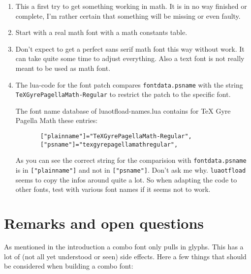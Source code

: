\documentclass[parskip=half-,egregdoesnotlikesansseriftitles]{scrartcl}
\begin{document}
\begin{enumerate}
\item  This a first try to get something working in math. It is in no way finished or complete, I'm rather certain that something  will be missing or even faulty.
\item  Start with a real math font with a math constants table. 
\item  Don't expect to get a perfect sans serif math font this way without work. It can take quite some time to adjust everything. Also a text font is not really meant to be used as math font.   
\item  The lua-code for the font patch compares \texttt{fontdata.psname} with the string \\\texttt{TeXGyrePagellaMath-Regular} to restrict the patch to the specific font.

       The font name database of luaotfload-names.lua contains for \textsf{TeX Gyre Pagella Math} these entries:
       
       \begin{verbatim}
       ["plainname"]="TeXGyrePagellaMath-Regular",
       ["psname"]="texgyrepagellamathregular",
       \end{verbatim}
       
  As you can see the correct string for the comparision with  \texttt{fontdata.psname}  is in \verb+["plainname"]+ and not in \verb+["psname"]+. Don't ask me why. \texttt{luaotfload} seems to copy the infos around quite a lot. So when adapting the code to other fonts, test with various font names if it seems not to work.
\end{enumerate}


\section{Remarks and open questions}

As mentioned in the introduction a combo font only pulls in glyphs. This has a lot of (not all yet understood or seen) side effects. Here a few things that should be considered when building a combo font:
\end{document}
